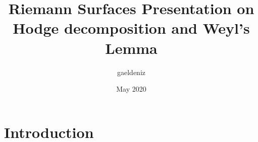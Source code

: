 \documentclass{article}
\title{Riemann Surfaces Presentation on Hodge decomposition and Weyl's Lemma}
\author{gaeldeniz }
\date{May 2020}
\begin{document}
\maketitle

\section{Introduction}
\end{document}
